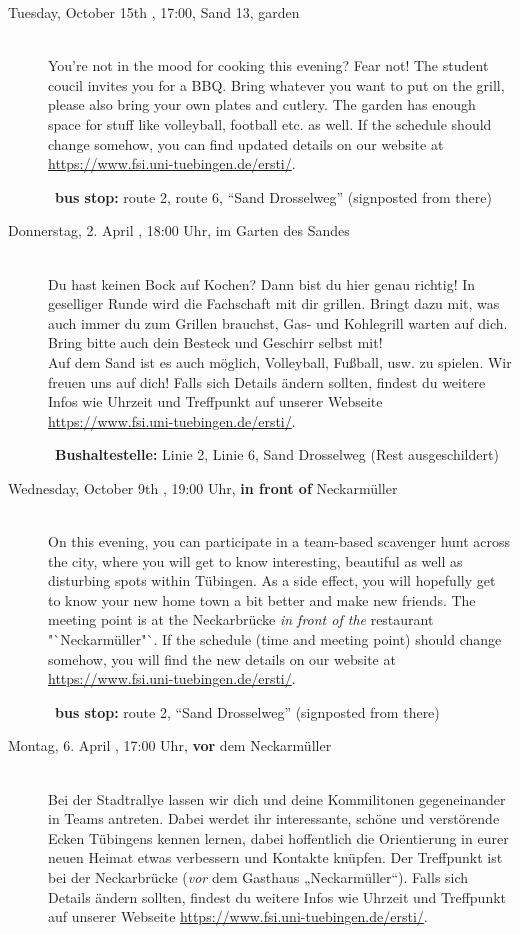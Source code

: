 \begin{description}
\ifml
	\item[Tuesday, October 15th \YEAR, 17:00, Sand 13, garden]\ \\
	You're not in the mood for cooking this evening? Fear not! The student coucil invites you for a BBQ. Bring whatever you want to put on the grill, please also bring your own plates and cutlery. The garden has enough space for stuff like volleyball, football etc. as well.
	If the schedule should change somehow, you can find updated details on our website at \url{https://www.fsi.uni-tuebingen.de/ersti/}.

	~\textbf{bus stop:} route 2, route 6, "`Sand Drosselweg"' (signposted from there)
\else
	\item[Donnerstag, 2. April \YEAR, 18:00 Uhr, im Garten des Sandes ]\ \\
	Du hast keinen Bock auf Kochen? Dann bist du hier genau richtig! In geselliger Runde wird die Fachschaft mit dir grillen. Bringt dazu mit, was auch immer du zum Grillen brauchst, Gas- und Kohlegrill warten auf dich. Bring bitte auch dein Besteck und Geschirr selbst mit!\\
	 Auf dem Sand ist es auch möglich, Volleyball, Fußball, usw. zu spielen. Wir freuen uns auf dich!
	Falls sich Details ändern sollten, findest du weitere Infos wie Uhrzeit und Treffpunkt auf unserer Webseite \url{https://www.fsi.uni-tuebingen.de/ersti/}.

	~\textbf{Bushaltestelle:} Linie 2, Linie 6, Sand Drosselweg (Rest ausgeschildert)
\fi

\ifml
	\item[Wednesday, October 9th \YEAR, 19:00 Uhr, \textbf{in front of} Neckarmüller ]\ \\
	On this evening, you can participate in a team-based scavenger hunt across the city, where you will get to know interesting, beautiful as well as disturbing spots within Tübingen. As a side effect, you will hopefully get to know your new home town a bit better and make new friends. The meeting point is at the Neckarbrücke \emph{in front of the} restaurant "`Neckarmüller"`.
	If the schedule (time and meeting point) should change somehow, you will find the new details on our website at \url{https://www.fsi.uni-tuebingen.de/ersti/}.

	~\textbf{bus stop:} route 2, "`Sand Drosselweg"' (signposted from there)
\else
	 \item[Montag, 6. April \YEAR, 17:00 Uhr, \textbf{vor} dem Neckarmüller ]\ \\
	 Bei der Stadtrallye lassen wir dich und deine Kommilitonen gegeneinander in Teams antreten. Dabei werdet ihr interessante, schöne und verstörende Ecken Tübingens kennen lernen, dabei hoffentlich die Orientierung in eurer neuen Heimat etwas verbessern und Kontakte knüpfen. Der Treffpunkt ist bei der Neckarbrücke (\emph{vor} dem Gasthaus „Neckarmüller“).
	 Falls sich Details ändern sollten, findest du weitere Infos wie Uhrzeit und Treffpunkt auf unserer Webseite \url{https://www.fsi.uni-tuebingen.de/ersti/}.
\fi


\end{description}
